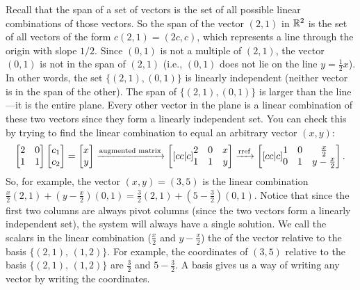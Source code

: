\begin{example}
Recall that the span of a set of vectors is the set of all possible linear combinations of those vectors.  So the span of the vector $(2,1)$ in $\mathbb{R}^2$ is the set of all vectors of the form $c(2,1)=(2c,c)$, which represents a line through the origin with slope $1/2$.  Since $(0,1)$ is not a multiple of $(2,1)$, the vector $(0,1)$ is not in the span of $(2,1)$ (i.e., $(0,1)$ does not lie on the line $y=\frac{1}{2}x$).  In other words, the set $\{(2,1),(0,1)\}$ is linearly independent (neither vector is in the span of the other).  The span of $\{(2,1),(0,1)\}$ is larger than the line---it is the entire plane. Every other vector in the plane is a linear combination of these two vectors since they form a linearly independent set. You can check this by trying to find the linear combination to equal an arbitrary vector $(x,y)$:
\begin{equation*}
\begin{bmatrix}
\begin{matrix} 2\\1 \end{matrix}&
\begin{matrix} 0\\1 \end{matrix}
\end{bmatrix}
\begin{bmatrix}c_1\\c_2\end{bmatrix}
=\begin{bmatrix}x\\y\end{bmatrix}
\xrightarrow{\text{augmented matrix}}
\begin{bmatrix}[cc|c]
\begin{matrix} 2\\1 \end{matrix}&
\begin{matrix} 0\\1 \end{matrix}&
\begin{matrix} x\\y \end{matrix}
\end{bmatrix}
\xrightarrow{\operatorname{rref}}
\begin{bmatrix}[cc|c]
\begin{matrix} 1\\0 \end{matrix}&
\begin{matrix} 0\\1 \end{matrix}&
\begin{matrix} \frac{x}{2}\\{y-\frac{x}{2}} \end{matrix}
\end{bmatrix}.
\end{equation*}
So, for example, the vector $(x,y)=(3,5)$ is the linear combination $\frac{x}{2}(2,1)+(y-\frac{x}{2})(0,1)=\frac{3}{2}(2,1)+(5-\frac{3}{2})(0,1)$.
Notice that since the first two columns are always pivot columns (since the two vectors form a linearly independent set), the system will always have a single solution. We call the scalars in the linear combination ($\frac{x}{2}$ and $y-\frac{x}{2}$) the  of the vector relative to the basis $\{(2,1),\, (1,2)\}$. For example, the coordinates of $(3,5)$ relative to the basis $\{(2,1),\, (1,2)\}$ are $\frac{3}{2}$ and $5-\frac{3}{2}$.  A basis gives us a way of writing any vector by writing the coordinates.


\end{example}
